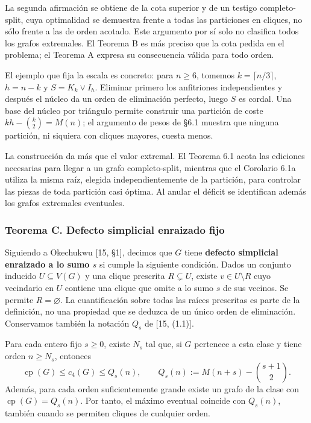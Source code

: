 \documentclass[spanish,11pt,a4paper]{article}
\begin{document}
La segunda afirmación se obtiene de la cota superior y de un testigo completo-split, cuya optimalidad se demuestra frente a todas las particiones en cliques, no sólo frente a las de orden acotado. Este argumento por sí solo no clasifica todos los grafos extremales. El Teorema B es más preciso que la cota pedida en el problema; el Teorema A expresa su consecuencia válida para todo orden.

El ejemplo que fija la escala es concreto: para \(n\ge6\), tomemos \(k=\lceil n/3\rceil\), \(h=n-k\) y \(S=K_k\vee I_h\). Eliminar primero los anfitriones independientes y después el núcleo da un orden de eliminación perfecto, luego \(S\) es cordal. Una base del núcleo por triángulo permite construir una partición de coste \(kh-\binom k2=M(n)\); el argumento de pesos de §6.1 muestra que ninguna partición, ni siquiera con cliques mayores, cuesta menos.

La construcción da más que el valor extremal. El Teorema 6.1 acota las ediciones necesarias para llegar a un grafo completo-split, mientras que el Corolario 6.1a utiliza la misma raíz, elegida independientemente de la partición, para controlar las piezas de toda partición casi óptima. Al anular el déficit se identifican además los grafos extremales eventuales.

\subsubsection{Teorema C. Defecto simplicial enraizado fijo}\label{teorema-c.-defecto-simplicial-enraizado-fijo}

Siguiendo a Okechukwu {[}15, §1{]}, decimos que \(G\) tiene \textbf{defecto simplicial enraizado a lo sumo \(s\)} si cumple la siguiente condición. Dados un conjunto inducido \(U\subseteq V(G)\) y una clique prescrita \(R\subsetneq U\), existe \(v\in U\setminus R\) cuyo vecindario en \(U\) contiene una clique que omite a lo sumo \(s\) de sus vecinos. Se permite \(R=\varnothing\). La cuantificación sobre todas las raíces prescritas es parte de la definición, no una propiedad que se deduzca de un único orden de eliminación. Conservamos también la notación \(Q_s\) de {[}15, (1.1){]}.

Para cada entero fijo \(s\ge0\), existe \(N_s\) tal que, si \(G\) pertenece a esta clase y tiene orden \(n\ge N_s\), entonces \[
\operatorname{cp}(G)\le c_4(G)\le Q_s(n),
\qquad
Q_s(n):=M(n+s)-\binom{s+1}{2}.
\tag{C}
\] Además, para cada orden suficientemente grande existe un grafo de la clase con \(\operatorname{cp}(G)=Q_s(n)\). Por tanto, el máximo eventual coincide con \(Q_s(n)\), también cuando se permiten cliques de cualquier orden.
\end{document}
